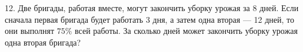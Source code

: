 12. Две бригады, работая вместе, могут закончить уборку урожая за 8 дней. Если сначала первая бригада будет работать 3 дня, а затем одна вторая --- 12 дней, то они выполнят $75\%$ всей работы. За сколько дней может закончить уборку урожая одна вторая бригада?\\
